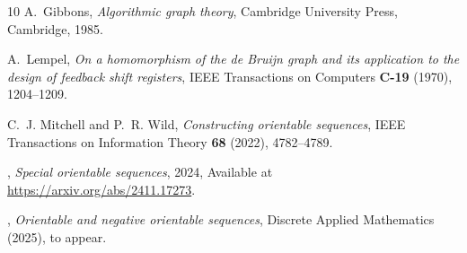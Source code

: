 \documentclass[a4paper,11pt]{article}
\begin{document}
\begin{thebibliography}{10}
 A.~Gibbons, \emph{Algorithmic graph theory}, Cambridge University Press,
  Cambridge, 1985.

 A.~Lempel, \emph{On a homomorphism of the de {B}ruijn graph and its application
  to the design of feedback shift registers}, {IEEE} Transactions on Computers
  \textbf{{\bf C-19}} (1970), 1204--1209.

 C.~J. Mitchell and P.~R. Wild, \emph{Constructing orientable sequences}, IEEE
  Transactions on Information Theory \textbf{68} (2022), 4782--4789.

 \bysame, \emph{Special orientable sequences}, 2024, Available at
  \url{https://arxiv.org/abs/2411.17273}.

 \bysame, \emph{Orientable and negative orientable sequences}, Discrete
    Applied
  Mathematics (2025), to appear.

\end{thebibliography}
\end{document}
